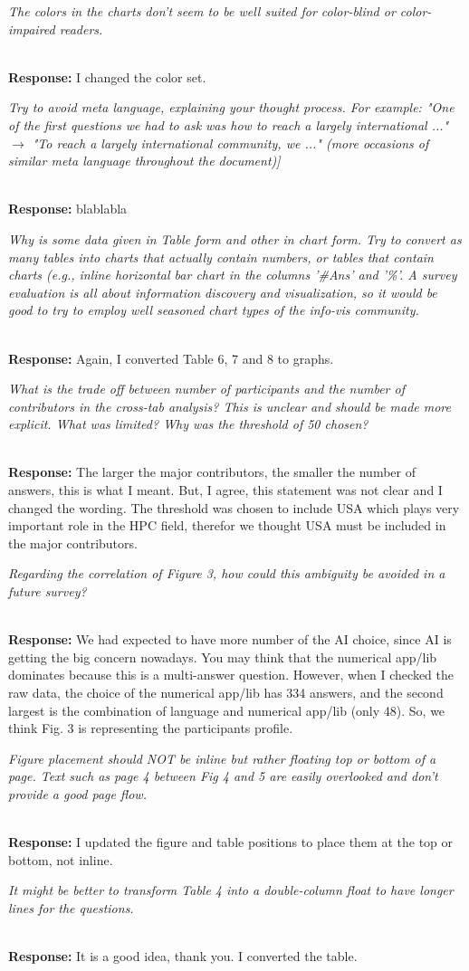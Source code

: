 \documentclass[11pt]{article}
\newcommand{\iresponse}[2]{{\item \em #1}\\%
  {\bf Response:} #2}
\begin{document}
\begin{enumerate}
\iresponse{The colors in the charts don't seem to be well suited for
  color-blind or color-impaired readers.}
{I changed the color set.}

\iresponse{Try to avoid meta language, explaining your thought
  process. For example: "One of the first questions we had to ask was
  how to reach a largely international ..."  $\to$ "To reach a largely
  international community, we ..." (more occasions of similar meta
  language throughout the document)]}
{blablabla}

\iresponse{Why is some data given in Table form and other in chart
  form. Try to convert as many tables into charts that actually
  contain numbers, or tables that contain charts (e.g., inline
  horizontal bar chart in the columns '\#Ans' and '\%'. A survey
  evaluation is all about information discovery and visualization, so
  it would be good to try to employ well seasoned chart types of the
  info-vis community.}
{Again, I converted Table 6, 7 and 8 to graphs.}

\iresponse{What is the trade off between number of participants and
  the number of contributors in the cross-tab analysis? This is
  unclear and should be made more explicit. What was limited? Why was
  the threshold of 50 chosen?}
{The larger the major contributors, the smaller the number of
  answers, this is what I meant. But, I agree, this statement was not
  clear and I changed the wording.  The threshold was chosen to
  include USA which plays very important role in the HPC field,
  therefor we thought USA must be included in the major contributors.}

\iresponse{Regarding the correlation of Figure 3, how could this
  ambiguity be avoided in a future survey?}
{We had expected to have more number of the AI choice, since AI is
  getting the big concern nowadays. You may think that the numerical
  app/lib dominates because this is a multi-answer question. However,
  when I checked the raw data, the choice of the numerical app/lib has
  334 answers, and the second largest is the combination of language and
  numerical app/lib (only 48). So, we think Fig. 3 is representing the
  participants profile. }

\iresponse{Figure placement should NOT be inline but rather floating
  top or bottom of a page. Text such as page 4 between Fig 4 and 5 are
  easily overlooked and don't provide a good page flow.}
{I updated the figure and table positions to place them at the top or
  bottom, not inline.}

\iresponse{It might be better to transform Table 4 into a
  double-column float to have longer lines for the questions.}
{It is a good idea, thank you. I converted the table.}


\end{enumerate}
\end{document}
